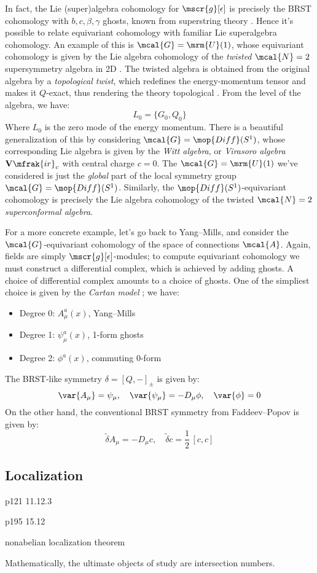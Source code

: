 \documentclass[a4paper
	,10pt
]{article}
\newcommand{\Vir}{\mathbf{V}\mfrak{ir}}
\begin{document}
	In fact, the Lie (super)algebra cohomology for $\mscr{g}[\epsilon]$ is precisely the BRST cohomology with $b,c,\beta,\gamma$ ghosts, known from superstring theory \cite{Polchinski:1998rr,Cordes:1994fc}. 
	Hence it's possible to relate equivariant cohomology with familiar Lie superalgebra cohomology. 
	An example of this is $\mcal{G} = \mrm{U}(1)$, whose equivariant cohomology is given by the Lie algebra cohomology of the \textit{twisted} $\mcal{N} = 2$ supersymmetry algebra in 2D \cite{Cordes:1994fc}. The twisted algebra is obtained from the original algebra by a \textit{topological twist}, which redefines the energy-momentum tensor and makes it $Q$-exact, thus rendering the theory topological \cite{Witten:1991zz,MauricioStuff}. From the level of the algebra, we have:
	\begin{equation}
		L_0 = \{G_0, Q_0\}
	\end{equation}
	Where $L_0$ is the zero mode of the energy momentum. 
	There is a beautiful generalization of this by considering $\mcal{G} = \mop{Diff}(S^1)$, whose corresponding Lie algebra is given by the \textit{Witt algebra}, or \textit{Virasoro algebra} $\Vir_c$ with central charge $c=0$. The $\mcal{G} = \mrm{U}(1)$ we've considered is just the \textit{global} part of the local symmetry group $\mcal{G} = \mop{Diff}(S^1)$. Similarly, the $\mop{Diff}(S^1)$-equivariant cohomology is precisely the Lie algebra cohomology of the twisted $\mcal{N} = 2$ \textit{superconformal algebra}.
	
	For a more concrete example, let's go back to Yang--Mills, and consider the $\mcal{G}$-equivariant cohomology of the space of connections $\mcal{A}$. Again, fields are simply $\mscr{g}[\epsilon]$-modules; to compute equivariant cohomology we must construct a differential complex, which is achieved by adding ghosts. A choice of differential complex amounts to a choice of ghosts. One of the simpliest choice is given by the \textit{Cartan model} \cite{Witten:1990bs,Cordes:1994fc}; we have:
	\begin{itemize}[noitemsep]
	\item Degree 0: $A^a_\mu(x)$, Yang--Mills
	\item Degree 1: $\psi^a_\mu(x)$, 1-form ghosts
	\item Degree 2: $\phi^a(x)$, commuting 0-form
	\end{itemize}
	The BRST-like symmetry $\delta = [Q,-]_\pm$ is given by:
	\begin{equation}
		\var{A_\mu} = \psi_\mu,
	\quad
		\var{\psi_\mu} = -D_\mu \phi,
	\quad
		\var{\phi} = 0
	\end{equation}
	On the other hand, the conventional BRST symmetry from Faddeev--Popov is given by:
	\begin{equation}
		\tilde{\delta}{A_\mu} = -D_\mu c,
	\quad
		\tilde{\delta}{c} = \frac{1}{2}\,[c,c]
	\end{equation}
	
\subsection{Localization}
	
	p121 11.12.3
	
	p195 15.12
	
	nonabelian localization theorem
	
	Mathematically, the ultimate objects of study are intersection numbers.

	
\raggedright

\printbibliography[%
	,heading = bibintoc
]
\end{document}

